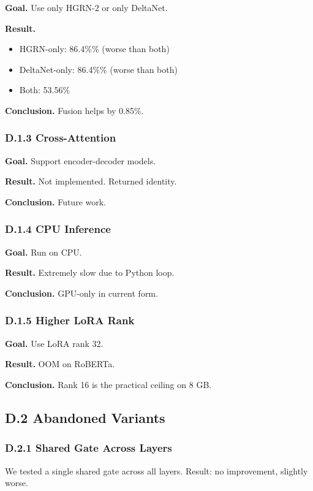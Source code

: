 \textbf{Goal.} Use only HGRN-2 or only DeltaNet.

\textbf{Result.}
\begin{itemize}
\item HGRN-only: 86.4\%\% (worse than both)
\item DeltaNet-only: 86.4\%\% (worse than both)
\item Both: 53.56\%

\end{itemize}
\textbf{Conclusion.} Fusion helps by 0.85\%.

\subsubsection{D.1.3 Cross-Attention}

\textbf{Goal.} Support encoder-decoder models.

\textbf{Result.} Not implemented. Returned identity.

\textbf{Conclusion.} Future work.

\subsubsection{D.1.4 CPU Inference}

\textbf{Goal.} Run on CPU.

\textbf{Result.} Extremely slow due to Python loop.

\textbf{Conclusion.} GPU-only in current form.

\subsubsection{D.1.5 Higher LoRA Rank}

\textbf{Goal.} Use LoRA rank 32.

\textbf{Result.} OOM on RoBERTa.

\textbf{Conclusion.} Rank 16 is the practical ceiling on 8 GB.

\subsection{D.2 Abandoned Variants}

\subsubsection{D.2.1 Shared Gate Across Layers}

We tested a single shared gate across all layers. Result: no improvement, 
slightly worse.

